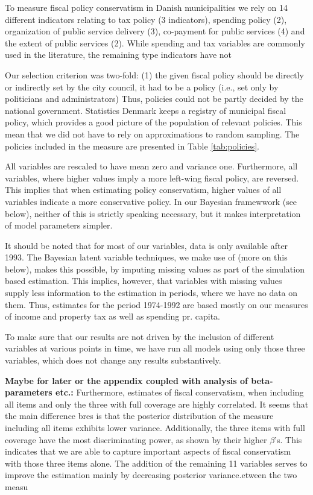 \documentclass[a4paper,12pt]{article}
\begin{document}
To measure fiscal policy conservatism in Danish municipalities we rely on 14 different indicators relating to tax policy (3 indicators), spending policy (2), organization of public service delivery (3), co-payment for public services (4) and the extent of public services (2). While  spending and tax variables are commonly used in the literature, the remaining type indicators have not 

Our selection criterion was two-fold: (1) the given fiscal policy should be directly or indirectly set by the city council, it had to be a policy (i.e., set only by politicians and administrators) Thus, policies could not be partly decided by the national government. Statistics Denmark keeps a registry of municipal fiscal policy, which provides a good picture of the population of relevant policies. This mean that we did not have to rely on approximations to random sampling. The policies included in the measure are presented in Table \ref{tab:policies}.



All variables are rescaled to have mean zero and variance one. Furthermore, all variables, where higher values imply a more left-wing fiscal policy, are reversed. This implies that when estimating policy conservatism, higher values of all variables indicate a more conservative policy. In our Bayesian framewwork (see below), neither of this is strictly speaking necessary, but it makes interpretation of model parameters simpler.

It should be noted that for most of our variables, data is only available after 1993. The Bayesian latent variable techniques, we make use of (more on this below), makes this possible, by imputing missing values as part of the simulation based estimation. This implies, however, that variables with missing values supply less information to the estimation in periods, where we have no data on them. Thus, estimates for the period 1974-1992 are based mostly on our measures of income and property tax as well as spending pr. capita. 

To make sure that our results are not driven by the inclusion of different variables at various points in time, we have run all models using only those three variables, which does not change any results substantively. 

\textbf{Maybe for later or the appendix coupled with analysis of beta-parameters etc.:} Furthermore, estimates of fiscal conservatism, when including all items and only the three with full coverage are highly correlated. It seems that the main difference bres is that the posterior distribution of the measure including all items exhibits lower variance. Additionally, the three items with full coverage have the most discriminating power, as shown by their higher $\beta$'s. This indicates that we are able to capture important aspects of fiscal conservatism with those three items alone. The addition of the remaining 11 variables serves to improve the estimation mainly by decreasing posterior variance.etween the two measu
\end{document}
